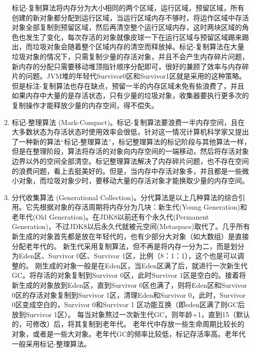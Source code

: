 \documentclass[../../../interview-questions.tex]{subfiles}
\begin{document}
\begin{enumerate}
    标记-复制算法将内存分为大小相同的两个区域，运行区域，预留区域，所有创建的新对象都分配到运行区域，当运行区域内存不够时，将运作区域中存活对象全部复制到预留区域，然后再清空整个运行区域内存，这时两块区域的角色也发生了变化，每次存活的对象就像皮球一下在运行区域与预留区域踢来踢出，而垃圾对象会随着整个区域内存的清空而释放掉。标记-复制算法在大量垃圾对象的情况下，只需复制少量的存活对象，并且不会产生内存碎片问题，新内存的分配只需要移动堆顶指针顺序分配即可，很好的兼顾了效率与内存碎片的问题。JVM堆的年轻代Survivor0区和Survivor1区就是采用的这种策略。但是标注-复制算法也存在缺点，预留一半的内存区域未免有些浪费了，并且如果内存中大量的是存活状态，只有少量的垃圾对象，收集器要执行更多次的复制操作才能释放少量的内存空间，得不偿失。
    \item{标记-整理算法 (Mark-Compact)。}标记-复制算法要浪费一半内存空间，且在大多数状态为存活状态时使用效率会很低，针对这一情况计算机科学家又提出了一种新的算法“标记-整理算法”，标记整理算法的标记阶段与其他算法一样，但是在整理阶段，算法将存活的对象向内存空间的一端移动，然后将存活对象边界以外的空间全部清空。标记整理算法解决了内存碎片问题，也不存在空间的浪费问题，看上去挺美好的。但是，当内存中存活对象多，并且都是一些微小对象，而垃圾对象少时，要移动大量的存活对象才能换取少量的内存空间。
    \item{分代收集算法 (Generational Collection)。}分代算法是以上几种算法的综合引用。它先根据对象的存活周期将内存分为几块：新生代(Young Generation)和老年代(Old Generation)。在JDK8以前还有个永久代(Permanent Generation)，不过JDK8以后永久代就被元空间(Metaspace)取代了。几乎所有新生成的对象首先都是放在年轻代的，也有少部分大对象（如大数组）是直接分配老年代的。
    新生代采用复制算法，但不再是将内存一分为二，而是划分为Eden区、Survivor 0区、Survivor 1区，比例（8：1：1），这个也是可以调整的。
    刚生成的对象一般是在Eden区，当Eden区满了后，就进行一次新生代GC。将存活的对象复制到Survivor 0区，此时Survivor 1区是空白的。接着将新生成的对象放到Eden区，直到Survivor 0区也满了，则将Eden区和Survivor 0区的存活对象复制到Survivor 1区，清理Eden和Survivor 0，此时，Survivor 0区变成空白的，Survivor 0和Survivor 1 区功能互换（即eden区满了则GC后放到Survivor 1区）。
    每当对象熬过一次新生代GC，则年龄+1，直到15（默认的，可修改）后，将其复制到老年代。
    老年代中存放一些生命周期比较长的对象，或者是一些大对象。老年代GC的频率比较低，标记存活率高。老年代一般采用标记-整理算法。
\end{enumerate}
\end{document}
